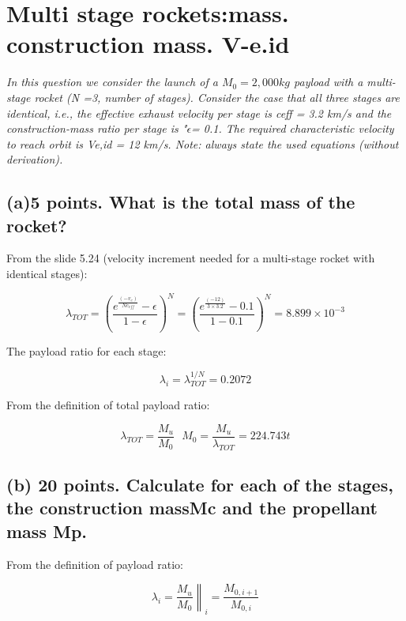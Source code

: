 \section{ Multi stage rockets:mass. construction mass. V-e.id }\label{sec:q2}    
\textit{In this question we consider the launch of a $M_0 = 2,000 kg$ payload with a multi-stage rocket (N =3, number of stages). Consider the case that all three stages are identical, i.e., the effective exhaust velocity per stage is ceff = 3.2 km/s and the construction-mass ratio per stage is "$\epsilon$= 0.1. The required characteristic velocity to reach orbit is Ve,id = 12 km/s. Note: always state the used equations (without derivation).}



\subsection{(a)5 points. What is the total mass of the rocket?} 

From the slide 5.24 (velocity increment needed for a multi-stage rocket with identical stages):

\begin{equation}
	\lambda_{TOT}= \left( \frac{e^\frac{(-v_e)}{Nc_{eff}}-\epsilon}{1-\epsilon}\right)^{N} = 
	\left( \frac{e^\frac{(-12)}{3\times 3.2}-0.1}{1-0.1}\right)^{N} = 8.899\times 10^{-3} 
	\tag{SLIDE 5.24}
\end{equation}

The payload ratio for each stage:

\begin{equation}
\lambda_{i} = \lambda_{TOT}^{1/N} = 0.2072
\end{equation}

From the definition of total payload ratio: 

\begin{equation}
\lambda_{TOT} = \frac{M_u}{M_0} \ \ \ M_0 = \frac{M_u}{\lambda_{TOT}} = 224.743 t
\end{equation}

\subsection{(b) 20 points. Calculate for each of the stages, the construction massMc and the propellant mass Mp.}

From the definition of payload ratio: 

\begin{equation}
\lambda_{i} =\left. \frac{M_u}{M_0} \right\|_i =  \frac{M_{0, i+1}}{M_{0, i}}
\end{equation}

